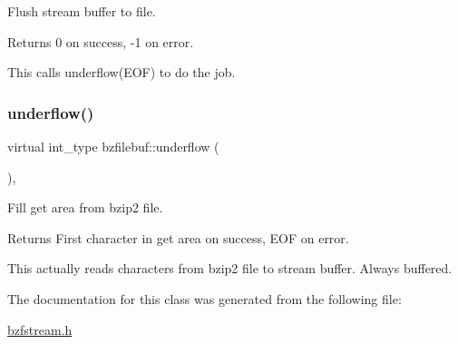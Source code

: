 Flush stream buffer to file. 

\begin{DoxyReturn}{Returns}
0 on success, -\/1 on error.
\end{DoxyReturn}
This calls underflow(\+E\+O\+F) to do the job. \mbox{\label{classbzfilebuf_a64837fcfe73bd81f226d0cdb47845ef8}} 
\subsubsection{\texorpdfstring{underflow()}{underflow()}}
{\footnotesize\ttfamily virtual int\+\_\+type bzfilebuf\+::underflow (\begin{DoxyParamCaption}{ }\end{DoxyParamCaption})\hspace{0.3cm}{\ttfamily [protected]}, {\ttfamily [virtual]}}



Fill get area from bzip2 file. 

\begin{DoxyReturn}{Returns}
First character in get area on success, E\+OF on error.
\end{DoxyReturn}
This actually reads characters from bzip2 file to stream buffer. Always buffered. 

The documentation for this class was generated from the following file\+:\begin{DoxyCompactItemize}
\item 
\hyperlink{bzfstream_8h}{bzfstream.\+h}\end{DoxyCompactItemize}
